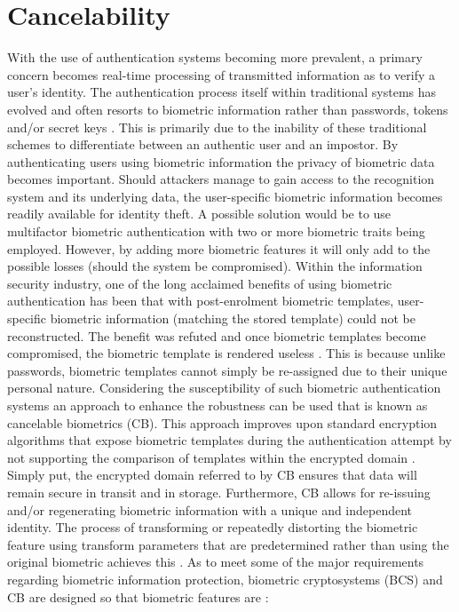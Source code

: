 \section[Cancelability]{Cancelability}
With the use of authentication systems becoming more prevalent, a primary concern becomes real-time processing of transmitted information as to verify a user’s identity. The authentication process itself within traditional systems has evolved and often resorts to biometric information rather than passwords, tokens and/or secret keys \citep{Verma2016}. This is primarily due to the inability of these traditional schemes to differentiate between an authentic user and an impostor. By authenticating users using biometric information the privacy of biometric data becomes important. Should attackers manage to gain access to the recognition system and its underlying data, the user-specific biometric information becomes readily available for identity theft. 
A possible solution would be to use multifactor biometric authentication with two or more biometric traits being employed. However, by adding more biometric features it will only add to the possible losses (should the system be compromised). Within the information security industry, one of the long acclaimed benefits of using biometric authentication has been that with post-enrolment biometric templates, user-specific biometric information (matching the stored template) could not be reconstructed. The benefit was refuted and once biometric templates become compromised, the biometric template is rendered useless \citep{Rathgeb2011}. This is because unlike passwords, biometric templates cannot simply be re-assigned due to their unique personal nature. Considering the susceptibility of such biometric authentication systems an approach to enhance the robustness can be used that is known as cancelable biometrics (CB). This approach improves upon standard encryption algorithms that expose biometric templates during the authentication attempt by not supporting the comparison of templates within the encrypted domain \citep{Rathgeb2011}. Simply put, the encrypted domain referred to by CB ensures that data will remain secure in transit and in storage. Furthermore, CB allows for re-issuing and/or regenerating biometric information with a unique and independent identity. The process of transforming or repeatedly distorting the biometric feature using transform parameters that are predetermined rather than using the original biometric achieves this \citep{Shahim2016}. As to meet some of the major requirements regarding biometric information protection, biometric cryptosystems (BCS) and CB are designed so that biometric features are \citep{Rathgeb2011, Verma2016}:

